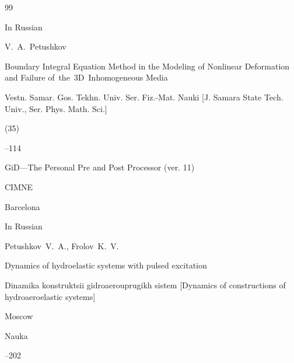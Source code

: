 \begin{thebibliography}{99}

\lang In Russian

\by V.~A.~Petushkov

\paper Boundary Integral Equation Method in the Modeling of Nonlinear Deformation and Failure of~the~3D~Inhomogeneous Media

\jour Vestn. Samar. Gos. Tekhn. Univ. Ser. Fiz.-Mat. Nauki \rm [J. Samara State Tech. Univ., Ser. Phys. Math. Sci.]


(35)

--114







\book  GiD---The Personal Pre and Post Processor (ver. 11)

\publ CIMNE

\publaddr Barcelona





\lang In Russian

\by Petushkov~V.~A., Frolov~K.~V.

\paper Dynamics of hydroelastic systems with pulsed excitation

\inbook Dinamika konstruktsii gidroaerouprugikh sistem \rm [Dynamics of constructions of hydroaeroelastic systems]

\publaddr Moscow

\publ Nauka


--202





\end{thebibliography}





\nopagenumber



\newpage



%

